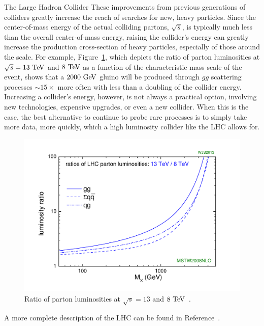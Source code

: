 \begin{section}{The Large Hadron Collider}
These improvements from previous generations of colliders greatly increase the reach of searches for new, heavy particles.
Since the center-of-mass energy of the actual colliding partons, $\sqrt{\hat{s}}$, is typically much less than the overall center-of-mass energy, raising the collider's energy can greatly increase the production cross-section of heavy particles, especially of those around the \TeV scale. 
For example, Figure~\ref{fig:parton_lumi}, which depicts the ratio of parton luminosities at $\sqrt{s} = 13~\mathrm{Te\kern -0.1em V}$ and $8~\mathrm{Te\kern -0.1em V}$ as a function of the characteristic mass scale of the event, shows that a $2000~\mathrm{Ge\kern -0.1em V}$ gluino will be produced through $gg$ scattering processes ${\sim}15\times$ more often with less than a doubling of the collider energy.
Increasing a collider's energy, however, is not always a practical option, involving new technologies, expensive upgrades, or even a new collider. When this is the case, the best alternative to continue to probe rare processes is to simply take more data, more quickly, which a high luminosity collider like the LHC allows for.

\begin{figure}[tbp!]
\begin{center}
\includegraphics[angle=0,width=0.80\columnwidth]{fig/parton_lumi.pdf}
\end{center}
\caption{Ratio of parton luminosities at $\sqrt{s} = 13$ and $8~\mathrm{Te\kern -0.1em V}$~\cite{parton_lumi}.}
\label{fig:parton_lumi}
\end{figure}

A more complete description of the LHC can be found in Reference~\cite{Evans:2008zzb}.

\end{section}

